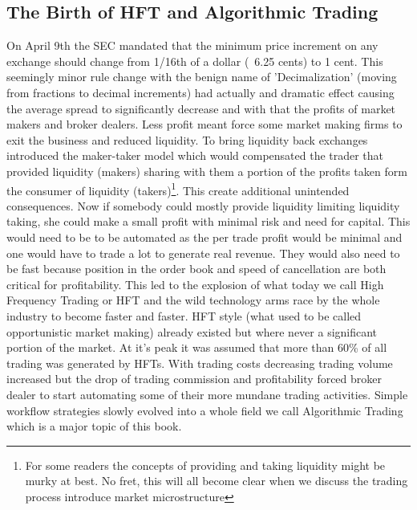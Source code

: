 \subsection{The Birth of HFT and Algorithmic Trading}
On April 9th the SEC mandated that the minimum price increment on any exchange should change from 1/16th of a dollar (~6.25 cents) to 1 cent. This seemingly  minor rule change with the benign name of 'Decimalization' (moving from fractions to decimal increments) had actually and dramatic effect causing the average spread to significantly decrease and with that the profits of market makers and broker dealers. Less profit meant force some market making firms to exit the business and reduced liquidity. To bring liquidity back exchanges introduced the maker-taker model which would compensated the trader that provided liquidity (makers) sharing with them a portion of the profits taken form the consumer of liquidity (takers)\footnote{For some readers the concepts of providing and taking liquidity might be murky at best. No fret, this will all become clear when we discuss the trading process introduce market microstructure}. This create additional unintended consequences. Now if somebody could mostly provide liquidity limiting liquidity taking, she could make a small profit with minimal risk and need for capital. This would need to be to be automated as the per trade profit would be minimal and one would have to trade a lot to generate real revenue. They would also need to be fast because position in the order book and speed of cancellation
are both critical for profitability. This led to the explosion of what today we call High Frequency Trading or HFT and the wild technology arms race by the whole industry to become faster and faster. HFT style (what used to be called opportunistic market making) already existed but where never a significant portion of the market. At it's peak it was assumed that more than 60\% of all trading was generated by HFTs. With trading costs decreasing trading volume increased but the drop of trading commission and profitability forced broker dealer to start automating some of their more mundane trading activities. Simple workflow strategies slowly evolved into a whole field we call Algorithmic Trading which is a major topic of this book.  

